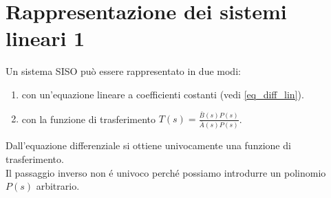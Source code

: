 \documentclass[../main.tex]{subfiles}
\begin{document}
	\section{Rappresentazione dei sistemi lineari 1}
	Un sistema SISO può essere rappresentato in due modi:
	\begin{enumerate}
		\item con un'equazione lineare a coefficienti costanti (vedi \ref{eq_diff_lin}).
		\item con la funzione di trasferimento $ T(s) = \frac{\bar{B}(s)P(s)}{\bar{A}(s)P(s)} $.
	\end{enumerate}
	Dall'equazione differenziale si ottiene univocamente una funzione di trasferimento.\\
	Il passaggio inverso non \'{e} univoco perch\'{e} possiamo introdurre un polinomio $ P(s) $ arbitrario.\\
\end{document}
